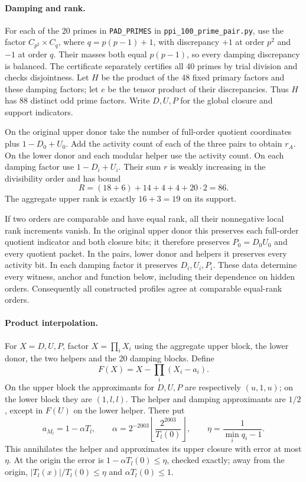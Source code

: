 \documentclass[11pt]{article}
\numberwithin{equation}{section}
\theoremstyle{definition}
\theoremstyle{remark}
\begin{document}
\paragraph{Damping and rank.}
For each of the 20 primes in \texttt{PAD\_PRIMES} in \texttt{ppi\_100\_prime\_pair.py}, use the factor
$C_{p^2}\times C_q$, where $q=p(p-1)+1$, with discrepancy $+1$ at
order $p^2$ and $-1$ at order $q$.  Their masses both equal $p(p-1)$,
so every damping discrepancy is balanced.  The certificate separately
certifies all 40 primes by trial division and checks disjointness.
Let $H$ be the product of the 48 fixed primary factors and these damping
factors; let $e$ be the tensor product of their discrepancies.  Thus
$H$ has 88 distinct odd prime factors.  Write $D,U,P$ for the global
closure and support indicators.

On the original upper donor take the number of full-order quotient
coordinates plus $1-D_0+U_0$.  Add the activity count of each of the
three pairs to obtain $r_A$.  On the lower donor and each modular helper
use the activity count.  On each damping factor use $1-D_i+U_i$.
Their sum $r$ is weakly increasing in the divisibility order and has
bound
\begin{equation}\label{h100:rank-bound}
 R=(18+6)+14+4+4+20\cdot2=86.
\end{equation}
The aggregate upper rank is exactly $16+3=19$ on its support.

If two orders are comparable and have equal rank, all their nonnegative
local rank increments vanish.  In the original upper donor this preserves
each full-order quotient indicator and both closure bits; it therefore
preserves $P_0=D_0U_0$ and every quotient packet.  In the pairs, lower
donor and helpers it preserves every activity bit.  In each damping
factor it preserves $D_i,U_i,P_i$.  These data determine every witness,
anchor and function below, including their dependence on hidden orders.
Consequently all constructed profiles agree at comparable equal-rank
orders.

\paragraph{Product interpolation.}
For $X=D,U,P$, factor $X=\prod_i X_i$ using the aggregate upper block,
the lower donor, the two helpers and the 20 damping blocks.  Define
\begin{equation}\label{h100:product-interpolation}
 F(X)=X-\prod_i(X_i-a_i).
\end{equation}
On the upper block the approximants for $D,U,P$ are respectively
$(u,1,u)$; on the lower block they are $(1,l,l)$.  The helper and damping
approximants are $1/2$, except in $F(U)$ on the lower helper.  There put
\[
 a_{M_l}=1-\alpha T_l,\qquad
 \alpha=2^{-2003}\left\lfloor\frac{2^{2003}}{T_l(0)}\right\rfloor,
 \qquad \eta=\frac1{\min_i q_i-1}.
\]
This annihilates the helper and approximates its upper closure with
error at most $\eta$.  At the origin the error is
$1-\alpha T_l(0)\le\eta$, checked exactly; away from the origin,
$|T_l(x)|/T_l(0)\le\eta$ and $\alpha T_l(0)\le1$.
\end{document}
